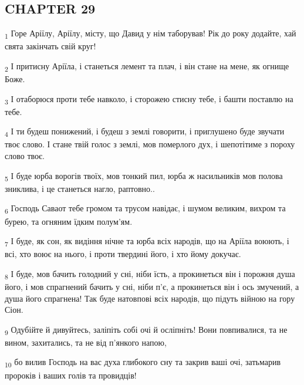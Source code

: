 \subsection{CHAPTER 29}
\begin{tcolorbox}
\textsubscript{1} Горе Аріїлу, Аріїлу, місту, що Давид у нім таборував! Рік до року додайте, хай свята закінчать свій круг!
\end{tcolorbox}
\begin{tcolorbox}
\textsubscript{2} І притисну Аріїла, і станеться лемент та плач, і він стане на мене, як огнище Боже.
\end{tcolorbox}
\begin{tcolorbox}
\textsubscript{3} І отаборюся проти тебе навколо, і сторожею стисну тебе, і башти поставлю на тебе.
\end{tcolorbox}
\begin{tcolorbox}
\textsubscript{4} І ти будеш понижений, і будеш з землі говорити, і приглушено буде звучати твоє слово. І стане твій голос з землі, мов померлого дух, і шепотітиме з пороху слово твоє.
\end{tcolorbox}
\begin{tcolorbox}
\textsubscript{5} І буде юрба ворогів твоїх, мов тонкий пил, юрба ж насильників мов полова зниклива, і це станеться нагло, раптовно..
\end{tcolorbox}
\begin{tcolorbox}
\textsubscript{6} Господь Саваот тебе громом та трусом навідає, і шумом великим, вихром та бурею, та огняним їдким полум'ям.
\end{tcolorbox}
\begin{tcolorbox}
\textsubscript{7} І буде, як сон, як видіння нічне та юрба всіх народів, що на Аріїла воюють, і всі, хто воює на нього, і проти твердині його, і хто йому докучає.
\end{tcolorbox}
\begin{tcolorbox}
\textsubscript{8} І буде, мов бачить голодний у сні, ніби їсть, а прокинеться він і порожня душа його, і мов спрагнений бачить у сні, ніби п'є, а прокинеться він і ось змучений, а душа його спрагнена! Так буде натовпові всіх народів, що підуть війною на гору Сіон.
\end{tcolorbox}
\begin{tcolorbox}
\textsubscript{9} Одубійте й дивуйтесь, заліпіть собі очі й осліпніть! Вони повпивалися, та не вином, захитались, та не від п'янкого напою,
\end{tcolorbox}
\begin{tcolorbox}
\textsubscript{10} бо вилив Господь на вас духа глибокого сну та закрив ваші очі, затьмарив пророків і ваших голів та провидців!
\end{tcolorbox}
